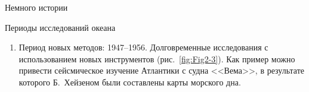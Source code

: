 \begin{chapter}{Немного истории}
\begin{section}{Периоды исследований океана}
\begin{enumerate}
\begin{figure}[t!]
\caption{Пример экспедиции периода национальных систематических исследований.
Путь НИС <<Метеор>> (Германия)~\cite{Wust:1964}.}
\label{fig:Fig2-2}
\end{figure}
%
% 

\item
Период новых методов: 1947--1956. Долговременные
исследования с использованием новых инструментов (рис.~\ref{fig:Fig2-3}). Как
пример можно привести сейсмическое изучение Атлантики с судна <<Вема>>, в
результате которого Б.~Хейзеном были составлены карты морского дна.
%


\end{enumerate}
\end{section}
\end{chapter}
